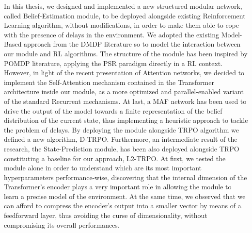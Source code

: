         In this thesis, we designed and implemented a new structured modular network, called Belief-Estimation module, to be deployed alongside existing Reinforcement Learning algorithm, without modifications, in order to make them able to cope with the presence of delays in the environment. We adopted the existing Model-Based approach from the DMDP literature so to model the interaction between our module and RL algorithms. The structure of the module has been inspired by POMDP literature, applying the PSR paradigm directly in a RL context. However, in light of the recent presentation of Attention networks, we decided to implement the Self-Attention mechanism contained in the Transformer architecture inside our module, as a more optimized and parallel-enabled variant of the standard Recurrent mechanisms. At last, a MAF network has been used to drive the output of the model towards a finite representation of the belief distribution of the current state, thus implementing a heuristic approach to tackle the problem of delays. By deploying the module alongside TRPO algorithm we defined a new algorithm, D-TRPO. Furthermore, an intermediate result of the research, the State-Prediction module, has been also deployed alongside TRPO constituting a baseline for our approach, L2-TRPO. \newline
        At first, we tested the module alone in order to understand which are its most important hyperparameters performance-wise, discovering that the internal dimension of the Transformer's encoder plays a very important role in allowing the module to learn a precise model of the environment. At the same time, we observed that we can afford to compress the encoder's output into a smaller vector by means of a feedforward layer, thus avoiding the curse of dimensionality, without compromising its overall performances. \newline
